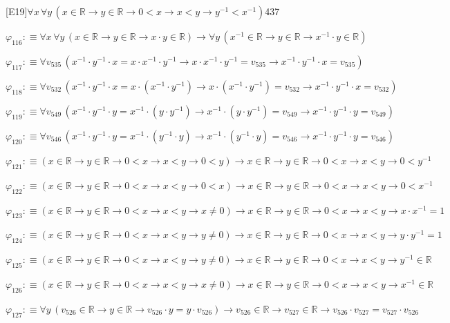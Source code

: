 \begin{fullproof}{[E19]}{$\forall x\,\forall y\,(x \in \mathbb{R} \to y \in \mathbb{R} \to 0 < x \to x < y \to y^{-1} < x^{-1})$}{437}
\begin{abbrevlist}
\item $\varphi_{116} :\equiv \forall x\,\forall y\,(x \in \mathbb{R} \to y \in \mathbb{R} \to x \cdot y \in \mathbb{R}) \to \forall y\,(x^{-1} \in \mathbb{R} \to y \in \mathbb{R} \to x^{-1} \cdot y \in \mathbb{R})$
\item $\varphi_{117} :\equiv \forall v_{535}\,(x^{-1} \cdot y^{-1} \cdot x = x \cdot x^{-1} \cdot y^{-1} \to x \cdot x^{-1} \cdot y^{-1} = v_{535} \to x^{-1} \cdot y^{-1} \cdot x = v_{535})$
\item $\varphi_{118} :\equiv \forall v_{532}\,(x^{-1} \cdot y^{-1} \cdot x = x \cdot (x^{-1} \cdot y^{-1}) \to x \cdot (x^{-1} \cdot y^{-1}) = v_{532} \to x^{-1} \cdot y^{-1} \cdot x = v_{532})$
\item $\varphi_{119} :\equiv \forall v_{549}\,(x^{-1} \cdot y^{-1} \cdot y = x^{-1} \cdot (y \cdot y^{-1}) \to x^{-1} \cdot (y \cdot y^{-1}) = v_{549} \to x^{-1} \cdot y^{-1} \cdot y = v_{549})$
\item $\varphi_{120} :\equiv \forall v_{546}\,(x^{-1} \cdot y^{-1} \cdot y = x^{-1} \cdot (y^{-1} \cdot y) \to x^{-1} \cdot (y^{-1} \cdot y) = v_{546} \to x^{-1} \cdot y^{-1} \cdot y = v_{546})$
\item $\varphi_{121} :\equiv (x \in \mathbb{R} \to y \in \mathbb{R} \to 0 < x \to x < y \to 0 < y) \to x \in \mathbb{R} \to y \in \mathbb{R} \to 0 < x \to x < y \to 0 < y^{-1}$
\item $\varphi_{122} :\equiv (x \in \mathbb{R} \to y \in \mathbb{R} \to 0 < x \to x < y \to 0 < x) \to x \in \mathbb{R} \to y \in \mathbb{R} \to 0 < x \to x < y \to 0 < x^{-1}$
\item $\varphi_{123} :\equiv (x \in \mathbb{R} \to y \in \mathbb{R} \to 0 < x \to x < y \to x \neq 0) \to x \in \mathbb{R} \to y \in \mathbb{R} \to 0 < x \to x < y \to x \cdot x^{-1} = 1$
\item $\varphi_{124} :\equiv (x \in \mathbb{R} \to y \in \mathbb{R} \to 0 < x \to x < y \to y \neq 0) \to x \in \mathbb{R} \to y \in \mathbb{R} \to 0 < x \to x < y \to y \cdot y^{-1} = 1$
\item $\varphi_{125} :\equiv (x \in \mathbb{R} \to y \in \mathbb{R} \to 0 < x \to x < y \to y \neq 0) \to x \in \mathbb{R} \to y \in \mathbb{R} \to 0 < x \to x < y \to y^{-1} \in \mathbb{R}$
\item $\varphi_{126} :\equiv (x \in \mathbb{R} \to y \in \mathbb{R} \to 0 < x \to x < y \to x \neq 0) \to x \in \mathbb{R} \to y \in \mathbb{R} \to 0 < x \to x < y \to x^{-1} \in \mathbb{R}$
\item $\varphi_{127} :\equiv \forall y\,(v_{526} \in \mathbb{R} \to y \in \mathbb{R} \to v_{526} \cdot y = y \cdot v_{526}) \to v_{526} \in \mathbb{R} \to v_{527} \in \mathbb{R} \to v_{526} \cdot v_{527} = v_{527} \cdot v_{526}$

\end{abbrevlist}
\end{fullproof}
